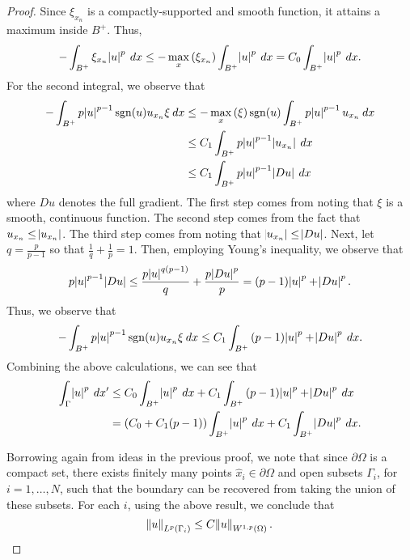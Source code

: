 \documentclass[10pt]{article}
\begin{document}
\begin{proof}
	Since $\xi_{x_n}$ is a compactly-supported and smooth function, it attains a maximum inside $B^+$. Thus, 
	\begin{equation*}
		\displaystyle -\int_{B^+}{\xi_{x_n} \abs{u}^p \: dx} \leq -\max\limits_{x}{(\xi_{x_n})}\int_{B^+}{\abs{u}^p \: dx} = C_0 \int_{B^+}{\abs{u}^p \: dx}.
	\end{equation*}
	For the second integral, we observe that 
	\begin{align*}
		\displaystyle -\int_{B^+}{p\abs{u}^{p-1} \operatorname{sgn}(u)u_{x_n}\xi \: dx} &\leq -\max\limits_{x}{(\xi)}\operatorname{sgn}(u)\int_{B^+}{p\abs{u}^{p-1}u_{x_n} \: dx} \\
		&\leq C_1\int_{B^+}{p\abs{u}^{p-1}\abs{u_{x_n}} \: dx} \\
		&\leq C_1\int_{B^+}{p\abs{u}^{p-1}\abs{Du} \: dx}
	\end{align*}
	where $Du$ denotes the full gradient. The first step comes from noting that $\xi$ is a smooth, continuous function. The second step comes from the fact that $u_{x_n} \leq \abs{u_{x_n}}$. The third step comes from noting that $\abs{u_{x_n}} \leq \abs{Du}$. Next, let $q = \frac{p}{p-1}$ so that $\tfrac{1}{q} + \tfrac{1}{p} = 1$. Then, employing Young's inequality, we observe that 
	\begin{equation*}
		\displaystyle p\abs{u}^{p-1}\abs{Du} \leq \frac{p\abs{u}^{q(p-1)}}{q} + \frac{p\abs{Du}^p}{p} = (p-1)\abs{u}^{p} + \abs{Du}^p. 
	\end{equation*}
	Thus, we observe that 
	\begin{equation*}
		\displaystyle -\int_{B^+}{p\abs{u}^{p-1} \operatorname{sgn}(u)u_{x_n}\xi \: dx} \leq C_1\int_{B^+}{(p-1)\abs{u}^p + \abs{Du}^p \: dx}.
	\end{equation*}
	Combining the above calculations, we can see that 
	\begin{align*}
		\displaystyle \int_{\Gamma}{\abs{u}^p \: dx'} &\leq C_0 \int_{B^+}{\abs{u}^p \: dx} + C_1\int_{B^+}{(p-1)\abs{u}^p + \abs{Du}^p \: dx} \\
		&= (C_0 + C_1(p-1))\int_{B^+}{\abs{u}^p \: dx} + C_1 \int_{B^+}{\abs{Du}^p \: dx}.
	\end{align*}
	
	Borrowing again from ideas in the previous proof, we note that since $\partial \Omega$ is a compact set, there exists finitely many points $\hat{x}_i \in \partial \Omega$ and open subsets $\Gamma_i$, for $i = 1,\dots,N$, such that the boundary can be recovered from taking the union of these subsets. For each $i$, using the above result, we conclude that 
	\begin{equation*}
		\displaystyle \norm{u}_{L^p(\Gamma_i)} \leq C\norm{u}_{W^{1,p}(\Omega)}. 
	\end{equation*}
	

\end{proof}
\end{document}
